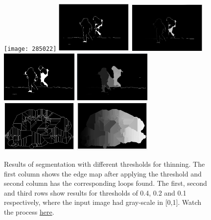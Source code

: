 \documentclass[10pt, twocolumn, twoside]{article}
\begin{document}
\begin{figure}[h!]
    \centering
    \texttt{[image: 285022]}
    \newline
    \includegraphics[width=1.5in]{images/285022_large_t.png}
    \includegraphics[width=1.5in]{images/285022_small_t.png}
    \includegraphics[width=1.5in]{images/285022_high_t.png}
    \includegraphics[width=1.5in]{images/285022_little_l.png}
    \includegraphics[width=1.5in]{images/285022_low_t.png}
    \includegraphics[width=1.5in]{images/285022_many_l.png}

    \caption{Results of segmentation with different thresholds for thinning. The first column shows the edge map after applying the threshold and second column has the corresponding loops found. The first, second and third rows show results for thresholds of 0.4, 0.2 and 0.1 respectively, where the input image had gray-scale in [0,1]. Watch the process \href{https://www.dropbox.com/s/2548p86sl9sgzq8/Segmentation.mov?dl=0}{here}. }
    \label{fig:reg32}
\end{figure}
\end{document}
